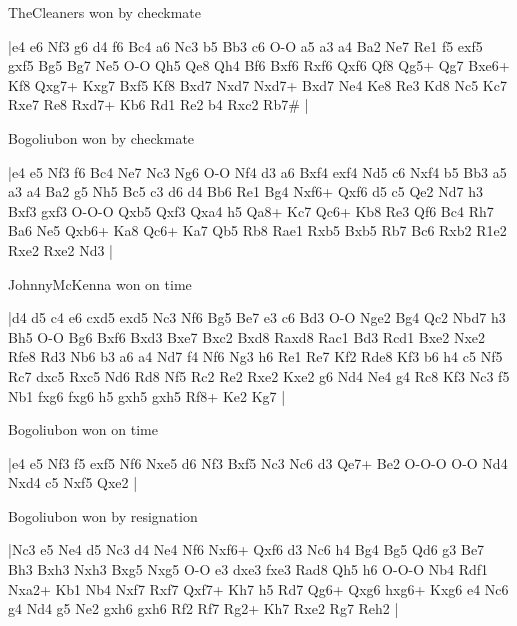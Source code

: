 \showboard

TheCleaners won by checkmate

\makegametitle
|e4 e6 Nf3 g6 d4 f6 Bc4 a6 Nc3 b5 Bb3 c6 O-O a5 a3 a4 Ba2 Ne7 Re1 f5 exf5 gxf5 Bg5 Bg7 Ne5 O-O Qh5 Qe8 Qh4 Bf6 Bxf6 Rxf6 Qxf6 Qf8 Qg5+ Qg7 Bxe6+ Kf8 Qxg7+ Kxg7 Bxf5 Kf8 Bxd7 Nxd7 Nxd7+ Bxd7 Ne4 Ke8 Re3 Kd8 Nc5 Kc7 Rxe7 Re8 Rxd7+ Kb6 Rd1 Re2 b4 Rxc2 Rb7\#  |

\showboard

Bogoliubon won by checkmate

\makegametitle
|e4 e5 Nf3 f6 Bc4 Ne7 Nc3 Ng6 O-O Nf4 d3 a6 Bxf4 exf4 Nd5 c6 Nxf4 b5 Bb3 a5 a3 a4 Ba2 g5 Nh5 Bc5 c3 d6 d4 Bb6 Re1 Bg4 Nxf6+ Qxf6 d5 c5 Qe2 Nd7 h3 Bxf3 gxf3 O-O-O Qxb5 Qxf3 Qxa4 h5 Qa8+ Kc7 Qc6+ Kb8 Re3 Qf6 Bc4 Rh7 Ba6 Ne5 Qxb6+ Ka8 Qc6+ Ka7 Qb5 Rb8 Rae1 Rxb5 Bxb5 Rb7 Bc6 Rxb2 R1e2 Rxe2 Rxe2 Nd3  |

\showboard

JohnnyMcKenna won on time

\makegametitle
|d4 d5 c4 e6 cxd5 exd5 Nc3 Nf6 Bg5 Be7 e3 c6 Bd3 O-O Nge2 Bg4 Qc2 Nbd7 h3 Bh5 O-O Bg6 Bxf6 Bxd3 Bxe7 Bxc2 Bxd8 Raxd8 Rac1 Bd3 Rcd1 Bxe2 Nxe2 Rfe8 Rd3 Nb6 b3 a6 a4 Nd7 f4 Nf6 Ng3 h6 Re1 Re7 Kf2 Rde8 Kf3 b6 h4 c5 Nf5 Rc7 dxc5 Rxc5 Nd6 Rd8 Nf5 Rc2 Re2 Rxe2 Kxe2 g6 Nd4 Ne4 g4 Rc8 Kf3 Nc3 f5 Nb1 fxg6 fxg6 h5 gxh5 gxh5 Rf8+ Ke2 Kg7  |

\showboard

Bogoliubon won on time

\makegametitle
|e4 e5 Nf3 f5 exf5 Nf6 Nxe5 d6 Nf3 Bxf5 Nc3 Nc6 d3 Qe7+ Be2 O-O-O O-O Nd4 Nxd4 c5 Nxf5 Qxe2  |

\showboard

Bogoliubon won by resignation

\makegametitle
|Nc3 e5 Ne4 d5 Nc3 d4 Ne4 Nf6 Nxf6+ Qxf6 d3 Nc6 h4 Bg4 Bg5 Qd6 g3 Be7 Bh3 Bxh3 Nxh3 Bxg5 Nxg5 O-O e3 dxe3 fxe3 Rad8 Qh5 h6 O-O-O Nb4 Rdf1 Nxa2+ Kb1 Nb4 Nxf7 Rxf7 Qxf7+ Kh7 h5 Rd7 Qg6+ Qxg6 hxg6+ Kxg6 e4 Nc6 g4 Nd4 g5 Ne2 gxh6 gxh6 Rf2 Rf7 Rg2+ Kh7 Rxe2 Rg7 Reh2  |

\showboard

